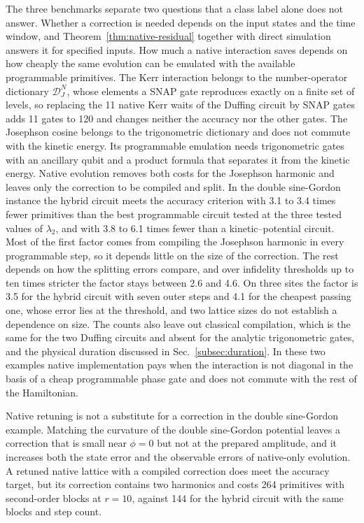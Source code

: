 \documentclass[pra,twocolumn,superscriptaddress,nofootinbib,floatfix]{revtex4-2}
\theoremstyle{remark}
\newcommand{\revcolor}{\color{blue}}
\DeclareRobustCommand{\rev}[1]{{\revcolor #1}}
\begin{document}
\rev{The three benchmarks separate two questions that a class label alone does not answer.} \rev{Whether a correction is needed depends on the input states and the time window, and Theorem~\ref{thm:native-residual} together with direct simulation answers it for specified inputs.} \rev{How much a native interaction saves depends on how cheaply the same evolution can be emulated with the available programmable primitives.} \rev{The Kerr interaction belongs to the number-operator dictionary \(\mathcal D_J^{N}\), whose elements a SNAP gate reproduces exactly on a finite set of levels, so replacing the 11 native Kerr waits of the Duffing circuit by SNAP gates adds 11 gates to 120 and changes neither the accuracy nor the other gates.} \rev{The Josephson cosine belongs to the trigonometric dictionary and does not commute with the kinetic energy.} \rev{Its programmable emulation needs trigonometric gates with an ancillary qubit and a product formula that separates it from the kinetic energy.} \rev{Native evolution removes both costs for the Josephson harmonic and leaves only the correction to be compiled and split.} \rev{In the double sine-Gordon instance the hybrid circuit meets the accuracy criterion with 3.1 to 3.4 times fewer primitives than the best programmable circuit tested at the three tested values of \(\lambda_2\), and with 3.8 to 6.1 times fewer than a kinetic--potential circuit.} \rev{Most of the first factor comes from compiling the Josephson harmonic in every programmable step, so it depends little on the size of the correction.} \rev{The rest depends on how the splitting errors compare, and over infidelity thresholds up to ten times stricter the factor stays between 2.6 and 4.6.} \rev{On three sites the factor is 3.5 for the hybrid circuit with seven outer steps and 4.1 for the cheapest passing one, whose error lies at the threshold, and two lattice sizes do not establish a dependence on size.} \rev{The counts also leave out classical compilation, which is the same for the two Duffing circuits and absent for the analytic trigonometric gates, and the physical duration discussed in Sec.~\ref{subsec:duration}.} \rev{In these two examples native implementation pays when the interaction is not diagonal in the basis of a cheap programmable phase gate and does not commute with the rest of the Hamiltonian.}

\rev{Native retuning is not a substitute for a correction in the double sine-Gordon example.} \rev{Matching the curvature of the double sine-Gordon potential leaves a correction that is small near \(\phi=0\) but not at the prepared amplitude, and it increases both the state error and the observable errors of native-only evolution.} \rev{A retuned native lattice with a compiled correction does meet the accuracy target, but its correction contains two harmonics and costs 264 primitives with second-order blocks at \(r=10\), against 144 for the hybrid circuit with the same blocks and step count.}
\end{document}
